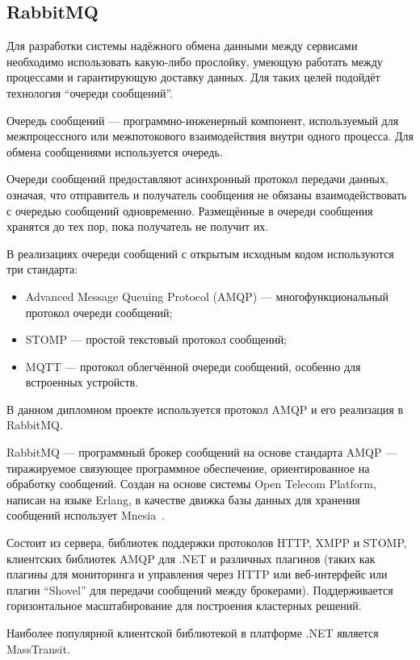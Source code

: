 \subsection{RabbitMQ}

Для разработки системы надёжного обмена данными между сервисами необходимо использовать какую-либо прослойку, умеющую работать между процессами и гарантирующую доставку данных. Для таких целей подойдёт технология ``очереди сообщений''.

Очередь сообщений — программно-инженерный компонент, используемый для межпроцессного или межпотокового взаимодействия внутри одного процесса. Для обмена сообщениями используется очередь.

Очереди сообщений предоставляют асинхронный протокол передачи данных, означая, что отправитель и получатель сообщения не обязаны взаимодействовать с очередью сообщений одновременно. Размещённые в очереди сообщения хранятся до тех пор, пока получатель не получит их.

В реализациях очереди сообщений с открытым исходным кодом используются три стандарта:

\begin{itemize}
    \item Advanced Message Queuing Protocol (AMQP) — многофункциональный протокол очереди сообщений;
    \item STOMP  — простой текстовый протокол сообщений;
    \item MQTT — протокол облегчённой очереди сообщений, особенно для встроенных устройств.
\end{itemize}

В данном дипломном проекте используется протокол AMQP и его реализация в RabbitMQ.

RabbitMQ — программный брокер сообщений на основе стандарта AMQP — тиражируемое связующее программное обеспечение, ориентированное на обработку сообщений. Создан на основе системы Open Telecom Platform, написан на языке Erlang, в качестве движка базы данных для хранения сообщений использует Mnesia~\cite{rabbitmq}.

Состоит из сервера, библиотек поддержки протоколов HTTP, XMPP и STOMP, клиентских библиотек AMQP для .NET и различных плагинов (таких как плагины для мониторинга и управления через HTTP или веб-интерфейс или плагин ``Shovel'' для передачи сообщений между брокерами). Поддерживается горизонтальное масштабирование для построения кластерных решений.

Наиболее популярной клиентской библиотекой в платформе .NET является MassTransit.

